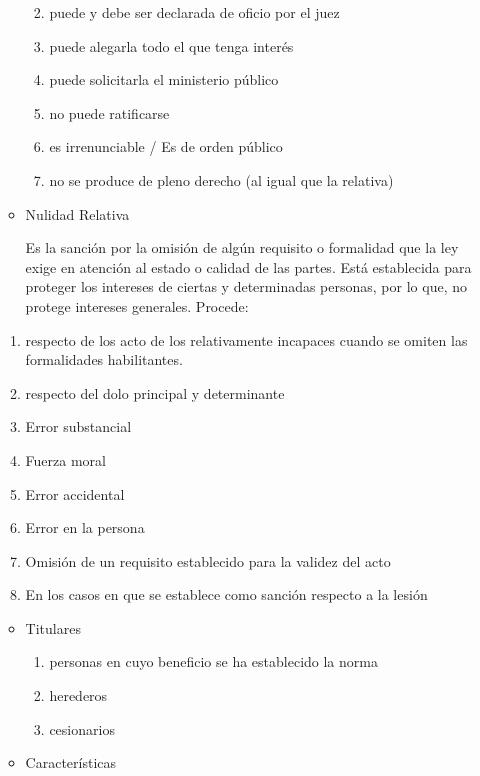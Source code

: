 \documentclass[]{article}
\providecommand{\tightlist}{%
  \setlength{\itemsep}{0pt}\setlength{\parskip}{0pt}}
\begin{document}
\begin{itemize}
\begin{itemize}
    \begin{enumerate}
    \def\labelenumi{\arabic{enumi}.}
    \tightlist
    \item
      puede y debe ser declarada de oficio por el juez
    \item
      puede alegarla todo el que tenga interés
    \item
      puede solicitarla el ministerio público
    \item
      no puede ratificarse\\
    \item
      es irrenunciable / Es de orden público
    \item
      no se produce de pleno derecho (al igual que la relativa)
    \end{enumerate}
  \item
    Nulidad Relativa

    Es la sanción por la omisión de algún requisito o formalidad que la
    ley exige en atención al estado o calidad de las partes. Está
    establecida para proteger los intereses de ciertas y determinadas
    personas, por lo que, no protege intereses generales. Procede:
  \end{itemize}

  \begin{enumerate}
  \def\labelenumi{\alph{enumi})}
  \tightlist
  \item
    respecto de los acto de los relativamente incapaces cuando se omiten
    las formalidades habilitantes.
  \item
    respecto del dolo principal y determinante
  \item
    Error substancial
  \item
    Fuerza moral
  \item
    Error accidental
  \item
    Error en la persona
  \item
    Omisión de un requisito establecido para la validez del acto
  \item
    En los casos en que se establece como sanción respecto a la lesión
  \end{enumerate}

  \begin{itemize}
  \tightlist
  \item
    Titulares

    \begin{enumerate}
    \def\labelenumi{\arabic{enumi}.}
    \tightlist
    \item
      personas en cuyo beneficio se ha establecido la norma
    \item
      herederos
    \item
      cesionarios
    \end{enumerate}
  \item
    Características


\end{itemize}
\end{itemize}
\end{document}
